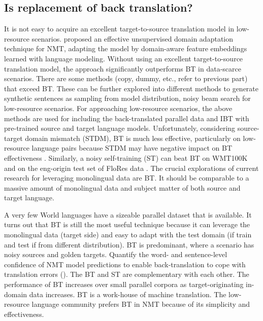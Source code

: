 \documentclass[manuscript,screen]{acmart}
\begin{document}
\subsection{Is replacement of back translation?}
It is not easy to acquire an excellent target-to-source translation model in low-resource scenarios. \citet{dou2019unsupervised} proposed an effective unsupervised domain adaptation technique for NMT, adapting the model by domain-aware feature embeddings learned with language modeling. Without using an excellent target-to-source translation model, the approach significantly outperforms BT in data-scarce scenarios. There are some methods (copy, dummy, etc., refer to previous part) that exceed BT. These can be further explored into different methods to generate synthetic sentences as sampling from model distribution, noisy beam search for low-resource scenarios. For approaching low-resource scenarios, the above methods are used for including the back-translated parallel data and IBT with pre-trained source and target language models. Unfortunately, considering source-target domain mismatch (STDM), BT is much less effective, particularly on low-resource language pairs because STDM may have negative impact on BT effectiveness \citet{shen2019source}. Similarly, a noisy self-training (ST) can beat BT on WMT100K and on the eng-origin test set of FloRes data \citet{he2019revisiting}. The crucial explorations of current research for leveraging monolingual data are BT. It should be comparable to a massive amount of monolingual data and subject matter of both source and target language. 

A very few World languages have a sizeable parallel dataset that is available. It turns out that BT is still the most useful technique because it can leverage the monolingual data (target side) and easy to adapt with the test domain (if train and test if from different distribution). 
BT is predominant, where a scenario has noisy sources and golden targets. Quantify the word- and sentence-level confidence of NMT model predictions to enable back-translation to cope with translation errors (\citet{wang2019improving}).  The BT and ST are complementary with each other. The performance of BT increases over small parallel corpora as target-originating in-domain data increases. BT is a work-house of machine translation. The low-resource language community prefers BT in NMT because of its simplicity and effectiveness.
\end{document}
